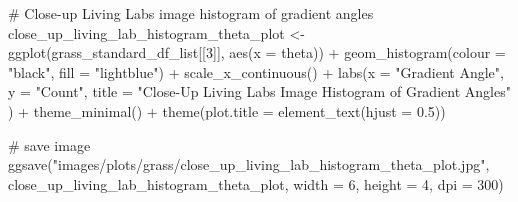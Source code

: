 \documentclass[
  letterpaper,
  DIV=11,
  numbers=noendperiod]{scrreprt}
\newenvironment{Shaded}{\begin{snugshade}}{\end{snugshade}}
\newcommand{\AttributeTok}[1]{\textcolor[rgb]{0.40,0.45,0.13}{#1}}
\newcommand{\CommentTok}[1]{\textcolor[rgb]{0.37,0.37,0.37}{#1}}
\newcommand{\DecValTok}[1]{\textcolor[rgb]{0.68,0.00,0.00}{#1}}
\newcommand{\FloatTok}[1]{\textcolor[rgb]{0.68,0.00,0.00}{#1}}
\newcommand{\FunctionTok}[1]{\textcolor[rgb]{0.28,0.35,0.67}{#1}}
\newcommand{\NormalTok}[1]{\textcolor[rgb]{0.00,0.23,0.31}{#1}}
\newcommand{\OtherTok}[1]{\textcolor[rgb]{0.00,0.23,0.31}{#1}}
\newcommand{\SpecialCharTok}[1]{\textcolor[rgb]{0.37,0.37,0.37}{#1}}
\newcommand{\StringTok}[1]{\textcolor[rgb]{0.13,0.47,0.30}{#1}}
\begin{document}
\begin{Shaded}
\begin{Highlighting}[]
\CommentTok{\# Close{-}up Living Labs image histogram of gradient angles}
\NormalTok{close\_up\_living\_lab\_histogram\_theta\_plot }\OtherTok{\textless{}{-}}
  \FunctionTok{ggplot}\NormalTok{(grass\_standard\_df\_list[[}\DecValTok{3}\NormalTok{]], }
         \FunctionTok{aes}\NormalTok{(}\AttributeTok{x =}\NormalTok{ theta)) }\SpecialCharTok{+}
  \FunctionTok{geom\_histogram}\NormalTok{(}\AttributeTok{colour =} \StringTok{"black"}\NormalTok{, }\AttributeTok{fill =} \StringTok{"lightblue"}\NormalTok{) }\SpecialCharTok{+}
  \FunctionTok{scale\_x\_continuous}\NormalTok{() }\SpecialCharTok{+} 
  \FunctionTok{labs}\NormalTok{(}\AttributeTok{x =} \StringTok{"Gradient Angle"}\NormalTok{, }
       \AttributeTok{y =} \StringTok{"Count"}\NormalTok{, }
       \AttributeTok{title =} \StringTok{"Close{-}Up Living Labs Image Histogram of Gradient Angles"}
\NormalTok{       ) }\SpecialCharTok{+}
  \FunctionTok{theme\_minimal}\NormalTok{() }\SpecialCharTok{+}
  \FunctionTok{theme}\NormalTok{(}\AttributeTok{plot.title =} \FunctionTok{element\_text}\NormalTok{(}\AttributeTok{hjust =} \FloatTok{0.5}\NormalTok{))}

\CommentTok{\# save image}
\FunctionTok{ggsave}\NormalTok{(}\StringTok{"images/plots/grass/close\_up\_living\_lab\_histogram\_theta\_plot.jpg"}\NormalTok{, close\_up\_living\_lab\_histogram\_theta\_plot, }\AttributeTok{width =} \DecValTok{6}\NormalTok{, }\AttributeTok{height =} \DecValTok{4}\NormalTok{, }\AttributeTok{dpi =} \DecValTok{300}\NormalTok{)}
\end{Highlighting}
\end{Shaded}
\end{document}
